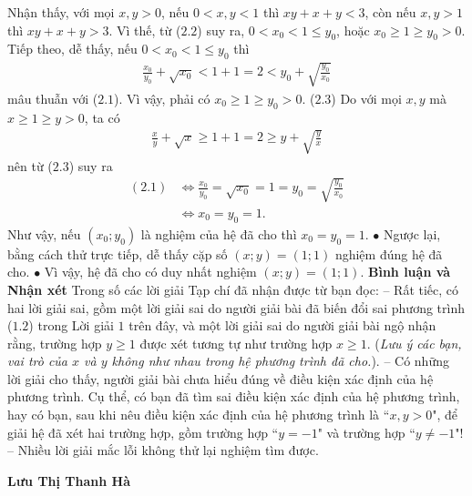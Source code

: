 \begin{multicols}{2}
	Nhận thấy, với mọi $x, y > 0$, nếu $0 < x, y < 1$ thì $xy + x + y < 3$, còn nếu $x, y > 1$ thì $xy + x + y > 3$. Vì thế, từ ($2.2$) suy ra,  $0 < {x_0} < 1 \le {y_0}$, hoặc  ${x_0} \ge 1 \ge {y_0} > 0$.
	\vskip 0.05cm
	Tiếp theo, dễ thấy, nếu $0 < {x_0} < 1 \le {y_0}$  thì
	\begin{align*}
		\frac{{{x_0}}}{{{y_0}}} + \sqrt {{x_0}}  < 1 + 1 = 2 < {y_0} + \sqrt {\frac{{{y_0}}}{{{x_0}}}}
	\end{align*}
	mâu thuẫn với ($2.1$). Vì vậy, phải có  ${x_0} \ge 1 \ge {y_0} > 0.$ \hfill ($2.3$)
	\vskip 0.05cm
	Do với mọi $x, y$ mà  $x \ge 1 \ge y > 0$, ta có
	\begin{align*}
		\frac{x}{y} + \sqrt x  \ge 1 + 1 = 2 \ge y + \sqrt {\frac{y}{x}}
	\end{align*}
	nên từ ($2.3$) suy ra
	\begin{align*}
		(2.1) &\Leftrightarrow \frac{{{x_0}}}{{{y_0}}} = \sqrt {{x_0}}  = 1 = {y_0} = \sqrt {\frac{{{y_0}}}{{{x_0}}}} \\
		&\Leftrightarrow {x_0} = {y_0} = 1.
	\end{align*}
	Như vậy, nếu $\left( {{x_0};{y_0}} \right)$ là nghiệm của hệ đã cho thì $x_0 = y_0 =1$.
	\vskip 0.05cm  
	$\bullet$ Ngược lại, bằng cách thử trực tiếp, dễ thấy cặp số $(x; y) = (1; 1)$ nghiệm đúng hệ đã cho.
	\vskip 0.05cm
	$\bullet$ Vì vậy, hệ đã cho có duy nhất nghiệm $(x; y) = (1; 1)$.
	\vskip 0.05cm
	\textbf{\color{thachthuctoanhoc}Bình luận và Nhận xét}
	\vskip 0.05cm
	Trong số các lời giải Tạp chí đã nhận được từ bạn đọc:
	\vskip 0.05cm
	-- Rất tiếc, có hai lời giải sai, gồm một lời giải sai do người giải bài đã biến đổi sai phương trình ($1.2$) trong Lời giải $1$ trên đây, và một lời giải sai do người giải bài ngộ nhận rằng, trường hợp $y \ge 1$ được xét tương tự như trường hợp $x \ge 1$. (\textit{Lưu ý các bạn, vai trò của $x$ và $y$ không như nhau trong hệ phương trình đã cho.}).
	\vskip 0.05cm
	-- Có những lời giải cho thấy, người giải bài chưa hiểu đúng về điều kiện xác định của hệ phương trình. Cụ thể, có bạn đã tìm sai điều kiện xác định của hệ phương trình, hay có bạn, sau khi nêu điều kiện xác định của hệ phương trình là ``$x, y > 0$", để giải hệ đã xét hai trường hợp, gồm trường hợp ``$y=-1$" và trường hợp ``$y \ne -1$"!
	\vskip 0.05cm
	-- Nhiều lời giải mắc lỗi không thử lại nghiệm tìm được.
	\begin{flushright}
		\textbf{\color{thachthuctoanhoc}Lưu Thị Thanh Hà}
	\end{flushright}

\end{multicols}
